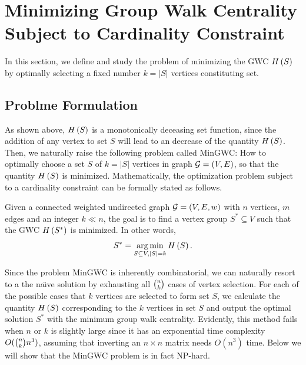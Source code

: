 \documentclass[10pt,twocolumn,twoside]{IEEEtran}
\begin{document}
\section{Minimizing  Group Walk Centrality Subject to Cardinality Constraint }

In this section, we define and study the problem of minimizing the GWC \(H\left(S\right)\) by optimally  selecting a fixed number $k=|S|$ vertices constituting set.

\subsection{Problme Formulation}

As shown above, \(H\left(S\right)\) is a monotonically deceasing set function, since the addition of any vertex to set $S$ will lead to an decrease of the quantity \(H\left(S\right)\). Then, we naturally raise the following problem called MinGWC: How to optimally choose a set $S$ of $k=|S|$ vertices in graph \(\mathcal{G}=(V,E)\), so that the quantity \(H\left(S\right)\) is minimized. Mathematically, the optimization problem subject to a cardinality constraint can be formally stated as follows.



\begin{problem}
Given a connected weighted undirected graph \(\mathcal{G}=(V,E,w)\) with \(n\) vertices, \(m\) edges and an integer \(k\ll n\), the goal is to find a vertex group \(S^*\subseteq V\) such that the GWC \(H\left(S^*\right)\) is minimized. In other words,
\begin{equation*}
    S^*=\operatorname*{arg\,min}_{S\subseteq V,\left|S \right|=k}H\left(S\right).
\end{equation*}
\end{problem}


Since the problem MinGWC is inherently combinatorial, we can naturally resort to a the na\"{\i}ve solution by exhausting all $\tbinom{n}{k}$ cases of vertex selection. For each of the possible cases that $k$ vertices are selected to form set $S$, we calculate the quantity \(H\left(S\right)\) corresponding to the $k$ vertices in set $S$ and output the optimal solution $S^*$ with the minimum group walk centrality. Evidently, this method fails when $n$ or $k$ is slightly large since it has an exponential time complexity $O(\tbinom{n}{k}n^3)$, assuming that inverting an $n \times n$ matrix needs $O(n^3)$  time. Below we will show that the  MinGWC problem is in fact NP-hard.
\end{document}
